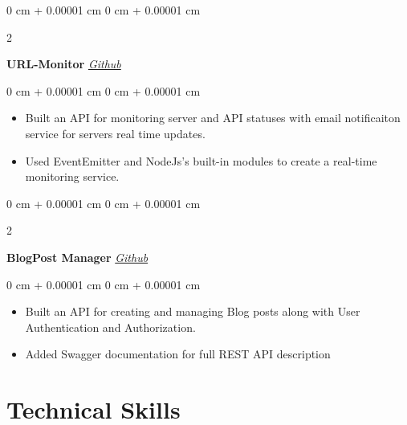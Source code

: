 \documentclass[10pt, letterpaper]{article}
\newenvironment{highlights}{
    \begin{itemize}[
        topsep=0.10 cm,
        parsep=0.10 cm,
        partopsep=0pt,
        itemsep=0pt,
        leftmargin=0 cm + 10pt
    ]
}{
    \end{itemize}
} %
\newenvironment{onecolentry}{
    \begin{adjustwidth}{
        0 cm + 0.00001 cm
    }{
        0 cm + 0.00001 cm
    }
}{
    \end{adjustwidth}
} %
\newenvironment{twocolentry}[2][]{
    \onecolentry
    \def\secondColumn{#2}
    \setcolumnwidth{\fill, 4.5 cm}
    \begin{paracol}{2}
}{
    \switchcolumn \raggedleft \secondColumn
    \end{paracol}
    \endonecolentry
} %
\begin{document}
        \begin{twocolentry}{
            \href{https://github.com/Ahmad-Abdalmageed/URL-Monitor}{\textit{Github}}
        }
            \textbf{URL-Monitor}\end{twocolentry}

        \vspace{0.10 cm}
        \begin{onecolentry}
            \begin{highlights}
                \item Built an API for monitoring server and API statuses with email notificaiton service for servers real time updates.
                \item Used EventEmitter and NodeJs's built-in modules to create a real-time monitoring service.
            \end{highlights}
        \end{onecolentry}


        \vspace{0.1 cm}

        \begin{twocolentry}{
            \href{https://github.com/Ahmad-Abdalmageed/blog}{\textit{Github}}
        }
            \textbf{BlogPost Manager}\end{twocolentry}

        \vspace{0.10 cm}
        \begin{onecolentry}
            \begin{highlights}
                \item Built an API for creating and managing Blog posts along with User Authentication and Authorization.
                \item Added Swagger documentation for full REST API description
            \end{highlights}
        \end{onecolentry}


    
    \section{Technical Skills}
        
\end{document}
